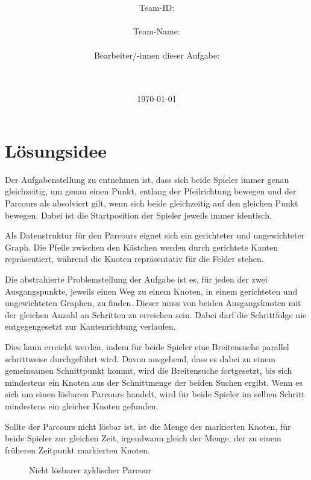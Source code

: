 \documentclass[a4paper,10pt,ngerman]{scrartcl}
\title{\textbf{\Huge\Aufgabe}}
\author{\LARGE Team-ID: \LARGE \TeamId \\\\
\LARGE Team-Name: \LARGE \TeamName \\\\
\LARGE Bearbeiter/-innen dieser Aufgabe: \\
\LARGE \Namen\\\\}
\date{\LARGE\today}
\begin{document}
    \maketitle
    \tableofcontents

    \vspace{0.5cm}


    \section{Lösungsidee}\label{sec:losungsidee}
    Der Aufgabenstellung zu entnehmen ist,
    dass sich beide Spieler immer genau gleichzeitig,
    um genau einen Punkt,
    entlang der Pfeilrichtung bewegen und der Parcours als absolviert gilt,
    wenn sich beide gleichzeitig auf den gleichen Punkt bewegen.
    Dabei ist die Startposition der Spieler jeweils immer identisch.

    Als Datenstruktur für den Parcours eignet sich ein gerichteter und ungewichteter Graph.
    Die Pfeile zwischen den Kästchen werden durch gerichtete Kanten repräsentiert,
    während die Knoten repräsentativ für die Felder stehen.

    Die abstrahierte Problemstellung der Aufgabe ist es,
    für jeden der zwei Ausgangspunkte,
    jeweils einen Weg zu einem Knoten,
    in einem gerichteten und ungewichteten Graphen,
    zu finden.
    Dieser muss von beiden Ausgangsknoten mit der gleichen Anzahl an Schritten zu erreichen sein.
    Dabei darf die Schrittfolge nie entgegengesetzt zur Kantenrichtung verlaufen.

    Dies kann erreicht werden,
    indem für beide Spieler eine Breitensuche parallel schrittweise durchgeführt wird.
    Davon ausgehend, dass es dabei zu einem gemeinsamen Schnittpunkt kommt,
    wird die Breitensuche fortgesetzt,
    bis sich mindestens ein Knoten aus der Schnittmenge der beiden Suchen ergibt.
    Wenn es sich um einen lösbaren Parcours handelt,
    wird für beide Spieler im selben Schritt mindestens ein gleicher Knoten gefunden.

    Sollte der Parcours nicht lösbar ist,
    ist die Menge der markierten Knoten,
    für beide Spieler zur gleichen Zeit,
    irgendwann gleich der Menge,
    der zu einem früheren Zeitpunkt markierten Knoten.

    \begin{figure}
        \centering
        \InfinityLoop{}
        \caption{Nicht lösbarer zyklischer Parcour}
        \label{fig:Figure1}
    \end{figure}
\end{document}
